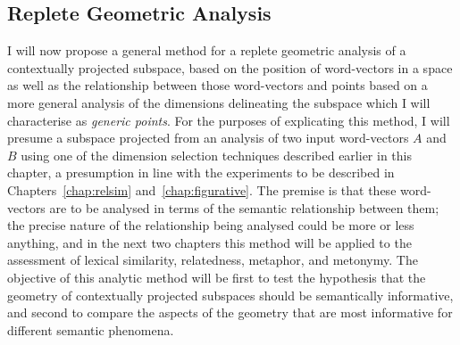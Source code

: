 \subsection{Replete Geometric Analysis} \label{sec:replete}
I will now propose a general method for a replete geometric analysis of a contextually projected subspace, based on the position of word-vectors in a space as well as the relationship between those word-vectors and points based on a more general analysis of the dimensions delineating the subspace which I will characterise as \emph{generic points}.  For the purposes of explicating this method, I will presume a subspace projected from an analysis of two input word-vectors $A$ and $B$ using one of the dimension selection techniques described earlier in this chapter, a presumption in line with the experiments to be described in Chapters~\ref{chap:relsim} and~\ref{chap:figurative}.  The premise is that these word-vectors are to be analysed in terms of the semantic relationship between them; the precise nature of the relationship being analysed could be more or less anything, and in the next two chapters this method will be applied to the assessment of lexical similarity, relatedness, metaphor, and metonymy.  The objective of this analytic method will be first to test the hypothesis that the geometry of contextually projected subspaces should be semantically informative, and second to compare the aspects of the geometry that are most informative for different semantic phenomena.


